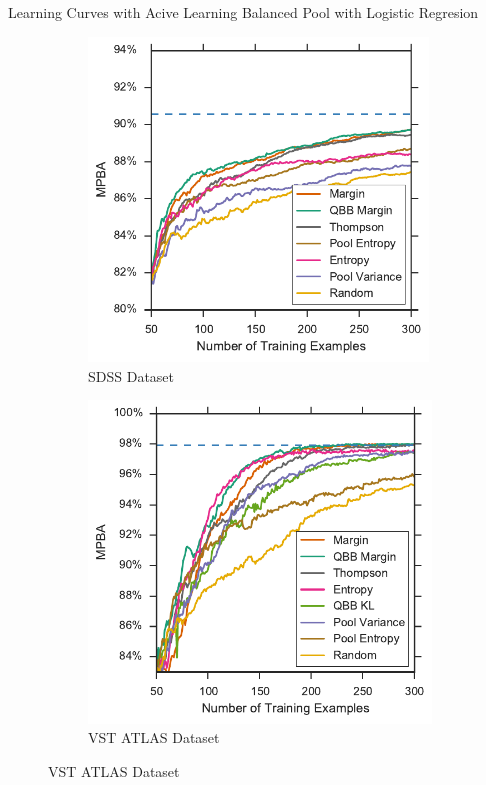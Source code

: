 \documentclass{beamer}
\begin{document}
\begin{frame}{Learning Curves with Acive Learning}
	Balanced Pool with Logistic Regresion
	\begin{figure}[tbp]
		\centering
		\begin{subfigure}{.5\textwidth}
			\centering
			\includegraphics[width=0.99\textwidth]{../thesis/figures/5_active/sdss_bl_ind_upper}
			\caption{SDSS Dataset}
		\end{subfigure}%
		\begin{subfigure}{.5\textwidth}
			\centering
			\includegraphics[width=0.99\linewidth]{../thesis/figures/5_active/vstatlas_bl_ind_upper}
			\caption{VST ATLAS Dataset}
		\end{subfigure}
	\end{figure}
\end{frame}
\end{document}
